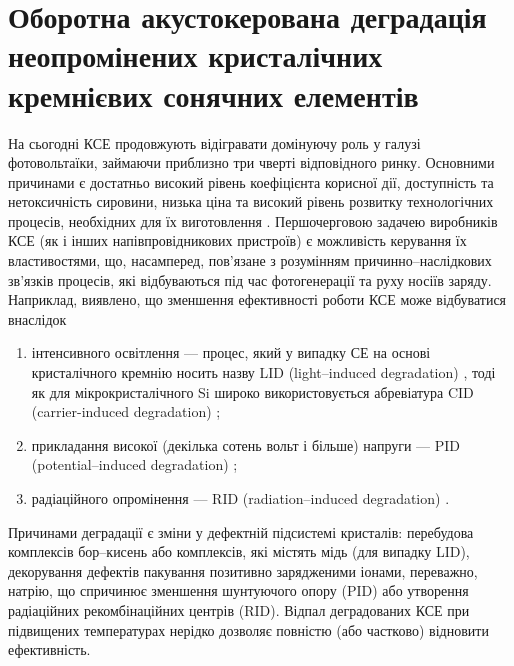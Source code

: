 \section{Оборотна акустокерована деградація неопромінених кристалічних кремнієвих сонячних елементів\label{USID}}

На сьогодні КСЕ продовжують відігравати домінуючу роль у галузі фотовольтаїки, займаючи приблизно три чверті відповідного ринку.
Основними причинами є достатньо високий рівень коефіцієнта корисної дії, доступність та нетоксичність сировини,
низька ціна та високий рівень розвитку технологічних процесів, необхідних для їх виготовлення \cite{Si:Hu}.
Першочерговою задачею виробників КСЕ (як і інших напівпровідникових пристроїв) є можливість керування їх властивостями,
що, насамперед, пов'язане з розумінням причинно--наслідкових зв'язків процесів, які відбуваються під час фотогенерації та руху носіїв заряду.
Наприклад, виявлено, що зменшення ефективності роботи КСЕ може відбуватися внаслідок
\begin{enumerate}[label=\asbuk*),leftmargin=0em,itemindent=1.5em]
  \item інтенсивного освітлення --- процес, який у випадку СЕ на основі кристалічного кремнію носить назву LID (light--induced degradation) \cite{LID:SchmidtJMR,LIDRev,LIDRev2,LID:JAP2017II}, тоді як для мікрокристалічного Si широко використовується абревіатура CID (carrier-induced degradation) \cite{CID:APL,CID:PPS};
  \item прикладання високої (декілька сотень вольт і більше) напруги --- PID  (potential--induced degradation) \cite{PID:SEMSC,PID:PP,PID:2017};
  \item радіаційного опромінення ---  RID (radiation--induced degradation) \cite{Bhat,Karazhanov}.
\end{enumerate}
Причинами деградації є зміни у дефектній підсистемі кристалів:
перебудова комплексів бор--кисень або комплексів, які містять мідь (для випадку LID),
декорування дефектів пакування позитивно зарядженими іонами, переважно, натрію, що спричинює зменшення шунтуючого опору (PID)
або утворення радіаційних рекомбінаційних центрів (RID).
Відпал деградованих КСЕ при підвищених температурах нерідко дозволяє повністю (або частково) відновити ефективність.

